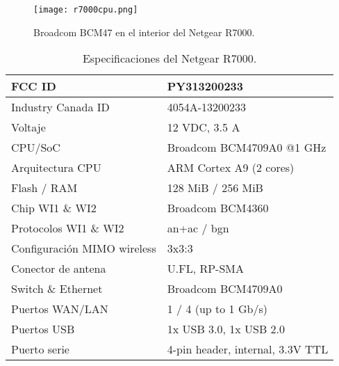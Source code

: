\begin{figure}[H]
    \centering
    \texttt{[image: r7000cpu.png]}
    \caption{Broadcom BCM47 en el interior del Netgear R7000.\cite{netgearFCCid}}
    \label{fig:r7000cpu}
\end{figure}

\begin{table}[H]
    \centering
    \begin{tabular}{ |l|m{17em}| }
    \hline
    FCC ID                      & PY313200233                      \\\hline
    Industry Canada ID          & 4054A-13200233                   \\\hline
    Voltaje                     & 12 VDC, 3.5 A                    \\\hline
    CPU/SoC                     & Broadcom BCM4709A0 @1 GHz        \\\hline
    Arquitectura CPU            & ARM Cortex A9 (2 cores)          \\\hline
    Flash / RAM                 & 128 MiB / 256 MiB                \\\hline
    Chip WI1 \& WI2             & Broadcom BCM4360                 \\\hline
    Protocolos WI1 \& WI2       & an+ac / bgn                      \\\hline
    Configuración MIMO wireless & 3x3:3                            \\\hline
    Conector de antena          & U.FL, RP-SMA                     \\\hline
    Switch \& Ethernet          & Broadcom BCM4709A0               \\\hline
    Puertos WAN/LAN             & 1 / 4 (up to 1 Gb/s)             \\\hline
    Puertos USB                 & 1x USB 3.0, 1x USB 2.0           \\\hline
    Puerto serie                & 4-pin header, internal, 3.3V TTL \\\hline
    \end{tabular}
    \caption{Especificaciones del Netgear R7000.\cite{r7000datasheet}}
    \label{table:r7000}
\end{table}

